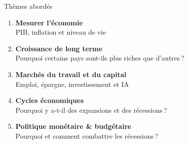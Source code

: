 \documentclass[aspectratio=169]{beamer}
\begin{document}
\begin{frame}{Thèmes abordés}
   \begin{enumerate}
      \setlength\itemsep{0.35cm}
      \item \textbf{Mesurer l'économie} \\
      {\small PIB, inflation et niveau de vie}
      \item \textbf{Croissance de long terme} \\
      {\small Pourquoi certains pays sont-ils plus riches que d'autres\,?}
      \item \textbf{Marchés du travail et du capital} \\
      {\small Emploi, épargne, investissement et IA}
      \item \textbf{Cycles économiques} \\
      {\small Pourquoi y a-t-il des expansions et des récessions\,?}
      \item \textbf{Politique monétaire \& budgétaire} \\
      {\small Pourquoi et comment combattre les récessions\,?}
   \end{enumerate}
\end{frame}

\end{document}
